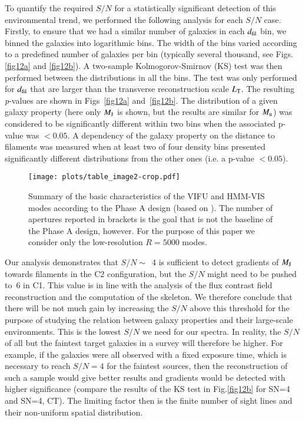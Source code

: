 \documentclass{aa}
\begin{document}
To quantify the required $S/N$  for a statistically significant detection of this environmental trend, we performed the following analysis for each $S/N$ case. Firstly, to ensure that we had a similar number of galaxies in each $d_{\rm fil}$ bin, we binned the galaxies into logarithmic bins. The width of the bins varied according to a predefined number of galaxies per bin (typically several thousand, see Figs. \ref{fig12a} and \ref{fig12b}). A two-sample Kolmogorov-Smirnov (KS) test was then performed between the distributions in all the bins. The test was only performed for $d_{\rm fil}$ that are larger than the transverse reconstruction scale $L_{\rm T}$. The resulting {\it p}-values are shown in Figs~\ref{fig12a} and~\ref{fig12b}. The distribution of a given galaxy property (here only $M_{\rm J}$ is shown, but the results are similar for $M_{\rm u}$) was considered to be significantly different within two  bins when the associated p-value was $<0.05$. A dependency of the galaxy property on the distance to filaments was measured when at least two of four density bins presented significantly different distributions from the other ones (i.e. a p-value $<0.05$).

\begin{figure*}
\begin{center}
\texttt{[image: plots/table\_image2-crop.pdf]}
\caption{Summary of the basic characteristics of the VIFU and HMM-VIS modes according to the Phase A design (based on \citealt{Jagourel2018}). The number of apertures reported in brackets is the goal that is not the baseline of the Phase A design, however. For the purpose of this paper we consider only the low-resolution $R=5000$ modes.}
\label{fig0}
\end{center}
\end{figure*}

Our analysis demonstrates that $S/N \sim$~4 is sufficient to detect gradients of $M_{\rm J}$ towards filaments in the C2 configuration, but the $S/N$ might need to be pushed to~6 in C1. This value is in line with the analysis of the flux contrast field reconstruction and the computation of the skeleton. We therefore conclude that there will be not much gain by increasing the $S/N$ above this threshold for the purpose of studying the relation between galaxy properties and their large-scale environments. This is the lowest $S/N$ we need for our spectra. In reality, the $S/N$ of all but the faintest target galaxies in a survey will therefore be higher. For example, if the galaxies were all observed with a fixed exposure time, which is necessary to reach $S/N=4$ for the faintest sources, then the reconstruction of such a sample would give better results and gradients would be detected with higher significance (compare the results of the KS test in Fig.\ref{fig12b} for SN=4 and SN=4, CT). The limiting factor then is the finite number of sight lines and their non-uniform spatial distribution.
\end{document}
